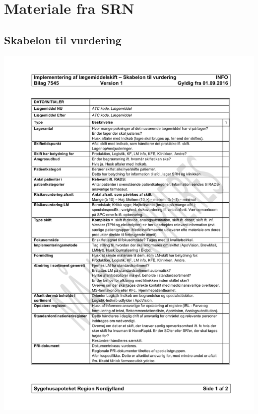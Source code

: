 
\newpage														%



\appendix


% 

\chapter{Materiale fra SRN} \vspace{-1cm} \section{Skabelon til vurdering}\label{App:Skabelon} 
\vspace{-1.2cm}
\includegraphics[scale=0.7]{appendiks/skabelon.pdf}

